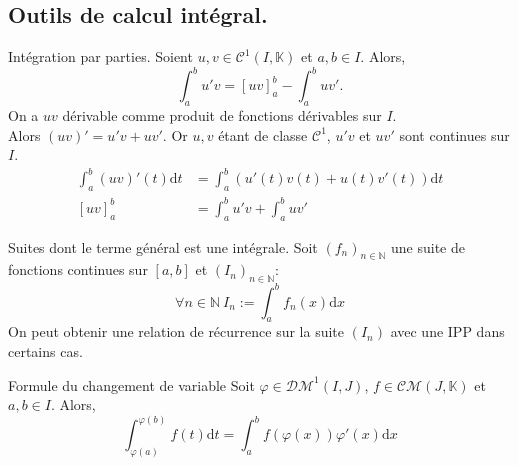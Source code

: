 \documentclass[11pt]{article}
\newcommand*{\K}{\mathbb{K}}
\newcommand*{\N}{\mathbb{N}}
\newcommand*{\m}{\mathcal}
\newcommand{\0}{\varnothing}
\newcommand{\dx}{\textrm{d}x}
\newcommand{\dt}{\textrm{d}t}
\renewcommand*{\phi}{\varphi}
\begin{document}
\subsection{Outils de calcul intégral.}

\begin{thm}{Intégration par parties.}{}
    Soient $u,v\in\m{C}^1(I,\K)$ et $a,b\in I$. Alors,
    \begin{equation*}
        \int_a^bu'v=[uv]_a^b-\int_a^buv'.
    \end{equation*}
    \tcblower
    On a $uv$ dérivable comme produit de fonctions dérivables sur $I$.\\
    Alors $(uv)'=u'v + uv'$. Or $u,v$ étant de classe $\m{C}^1$, $u'v$ et $uv'$ sont continues sur $I$.
    \begin{align*}
        \int_a^b(uv)'(t)\dt&=\int_a^b(u'(t)v(t)+u(t)v'(t))\dt\\
        [uv]_a^b &= \int_a^bu'v+\int_a^buv'
    \end{align*}
\end{thm}

\begin{ex}{Suites dont le terme général est une intégrale.}{}
    Soit $(f_n)_{n\in\N}$ une suite de fonctions continues sur $[a,b]$ et $(I_n)_{n\in\N}$:
    \begin{equation*}
        \forall n\in\N ~ I_n := \int_a^bf_n(x)\dx 
    \end{equation*}
    On peut obtenir une relation de récurrence sur la suite $(I_n)$ avec une IPP dans certains cas.
\end{ex}

\begin{thm}{Formule du changement de variable}{}
    Soit $\phi\in\m{DM}^1(I,J)$, $f\in\m{CM}(J,\K)$ et $a,b\in I$. Alors,
    \begin{equation*}
        \int_{\phi(a)}^{\phi(b)}f(t)\dt=\int_a^bf(\phi(x))\phi'(x)\dx
    \end{equation*}
\end{thm}
\end{document}
